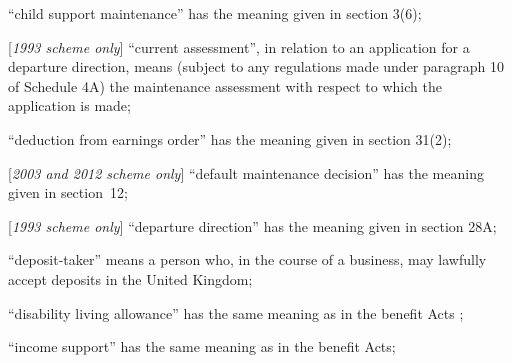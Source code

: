 \documentclass[12pt,a4paper]{article}
\begin{document}
\begin{enumerate}
    “child support maintenance” has the meaning given in section 3(6);



[\emph{1993 scheme only}]     “current assessment”, in relation to an application for a departure direction, means (subject to any regulations made under paragraph 10 of Schedule 4A) the maintenance assessment with respect to which the application is made;

    “deduction from earnings order” has the meaning given in section 31(2);

[\emph{2003 and 2012 scheme only}] “default maintenance decision” has the meaning given in section~12;

[\emph{1993 scheme only}]     “departure direction” has the meaning given in section 28A;

“deposit-taker” means a person who, in the course of a business, may lawfully accept deposits in the United Kingdom;

    “disability living allowance” has the same meaning as in the 
benefit Acts%
;



    “income support” has the same meaning as in the benefit Acts;


\end{enumerate}
\end{document}
